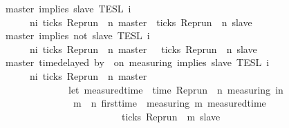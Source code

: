 \begin{isabellebody}
{\isacharbar}\ {\isacartoucheopen}{\isasymlbrakk}\ master\ implies\ slave\ {\isasymrbrakk}\isactrlsub T\isactrlsub E\isactrlsub S\isactrlsub L\isactrlbsup {\isasymge}\ i\isactrlesup \ {\isacharequal}\isanewline
\ \ \ \ \ \ {\isacharbraceleft}{\isasymrho}{\isachardot}\ {\isasymforall}n{\isasymge}i{\isachardot}\ ticks\ {\isacharparenleft}{\isacharparenleft}Rep{\isacharunderscore}run\ {\isasymrho}{\isacharparenright}\ n\ master{\isacharparenright}\ {\isasymlongrightarrow}\ ticks\ {\isacharparenleft}{\isacharparenleft}Rep{\isacharunderscore}run\ {\isasymrho}{\isacharparenright}\ n\ slave{\isacharparenright}{\isacharbraceright}{\isacartoucheclose}\isanewline
{\isacharbar}\ {\isacartoucheopen}{\isasymlbrakk}\ master\ implies\ not\ slave\ {\isasymrbrakk}\isactrlsub T\isactrlsub E\isactrlsub S\isactrlsub L\isactrlbsup {\isasymge}\ i\isactrlesup \ {\isacharequal}\isanewline
\ \ \ \ \ \ {\isacharbraceleft}{\isasymrho}{\isachardot}\ {\isasymforall}n{\isasymge}i{\isachardot}\ ticks\ {\isacharparenleft}{\isacharparenleft}Rep{\isacharunderscore}run\ {\isasymrho}{\isacharparenright}\ n\ master{\isacharparenright}\ {\isasymlongrightarrow}\ {\isasymnot}\ ticks\ {\isacharparenleft}{\isacharparenleft}Rep{\isacharunderscore}run\ {\isasymrho}{\isacharparenright}\ n\ slave{\isacharparenright}{\isacharbraceright}{\isacartoucheclose}\isanewline
{\isacharbar}\ {\isacartoucheopen}{\isasymlbrakk}\ master\ time{\isacharminus}delayed\ by\ {\isasymdelta}{\isasymtau}\ on\ measuring\ implies\ slave\ {\isasymrbrakk}\isactrlsub T\isactrlsub E\isactrlsub S\isactrlsub L\isactrlbsup {\isasymge}\ i\isactrlesup \ {\isacharequal}\isanewline
\ \ \ \ \ \ {\isacharbraceleft}{\isasymrho}{\isachardot}\ {\isasymforall}n{\isasymge}i{\isachardot}\ ticks\ {\isacharparenleft}{\isacharparenleft}Rep{\isacharunderscore}run\ {\isasymrho}{\isacharparenright}\ n\ master{\isacharparenright}\ {\isasymlongrightarrow}\isanewline
\ \ \ \ \ \ \ \ \ \ \ \ \ \ \ {\isacharparenleft}let\ measured{\isacharunderscore}time\ {\isacharequal}\ time\ {\isacharparenleft}{\isacharparenleft}Rep{\isacharunderscore}run\ {\isasymrho}{\isacharparenright}\ n\ measuring{\isacharparenright}\ in\isanewline
\ \ \ \ \ \ \ \ \ \ \ \ \ \ \ \ {\isasymforall}m\ {\isasymge}\ n{\isachardot}\ first{\isacharunderscore}time\ {\isasymrho}\ measuring\ m\ {\isacharparenleft}measured{\isacharunderscore}time\ {\isacharplus}\ {\isasymdelta}{\isasymtau}{\isacharparenright}\isanewline
\ \ \ \ \ \ \ \ \ \ \ \ \ \ \ \ \ \ \ \ \ \ \ \ \ {\isasymlongrightarrow}\ ticks\ {\isacharparenleft}{\isacharparenleft}Rep{\isacharunderscore}run\ {\isasymrho}{\isacharparenright}\ m\ slave{\isacharparenright}\isanewline

\end{isabellebody}
